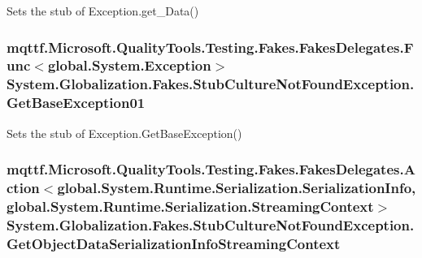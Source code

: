 Sets the stub of Exception.\-get\-\_\-\-Data()

\hypertarget{class_system_1_1_globalization_1_1_fakes_1_1_stub_culture_not_found_exception_a826452c1b24148075ca1fcbcf19b6a49}{
\subsubsection[{Get\-Base\-Exception01}]{\setlength{\rightskip}{0pt plus 5cm}mqttf.\-Microsoft.\-Quality\-Tools.\-Testing.\-Fakes.\-Fakes\-Delegates.\-Func$<$global.\-System.\-Exception$>$ System.\-Globalization.\-Fakes.\-Stub\-Culture\-Not\-Found\-Exception.\-Get\-Base\-Exception01}}\label{class_system_1_1_globalization_1_1_fakes_1_1_stub_culture_not_found_exception_a826452c1b24148075ca1fcbcf19b6a49}


Sets the stub of Exception.\-Get\-Base\-Exception()

\hypertarget{class_system_1_1_globalization_1_1_fakes_1_1_stub_culture_not_found_exception_a8fe23a26a78a3dc11a7694285b378995}{
\subsubsection[{Get\-Object\-Data\-Serialization\-Info\-Streaming\-Context}]{\setlength{\rightskip}{0pt plus 5cm}mqttf.\-Microsoft.\-Quality\-Tools.\-Testing.\-Fakes.\-Fakes\-Delegates.\-Action$<$global.\-System.\-Runtime.\-Serialization.\-Serialization\-Info, global.\-System.\-Runtime.\-Serialization.\-Streaming\-Context$>$ System.\-Globalization.\-Fakes.\-Stub\-Culture\-Not\-Found\-Exception.\-Get\-Object\-Data\-Serialization\-Info\-Streaming\-Context}}\label{class_system_1_1_globalization_1_1_fakes_1_1_stub_culture_not_found_exception_a8fe23a26a78a3dc11a7694285b378995}


